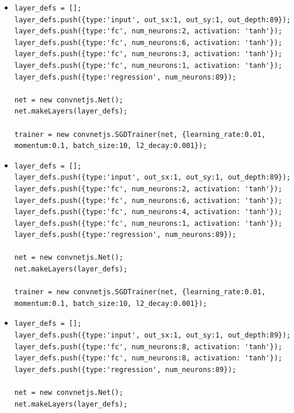 \begin{itemize}
\item \begin{verbatim}
layer_defs = [];
layer_defs.push({type:'input', out_sx:1, out_sy:1, out_depth:89});
layer_defs.push({type:'fc', num_neurons:2, activation: 'tanh'});
layer_defs.push({type:'fc', num_neurons:6, activation: 'tanh'});
layer_defs.push({type:'fc', num_neurons:3, activation: 'tanh'});
layer_defs.push({type:'fc', num_neurons:1, activation: 'tanh'});
layer_defs.push({type:'regression', num_neurons:89});

net = new convnetjs.Net();
net.makeLayers(layer_defs);

trainer = new convnetjs.SGDTrainer(net, {learning_rate:0.01, 
momentum:0.1, batch_size:10, l2_decay:0.001});
\end{verbatim}

\item \begin{verbatim}
layer_defs = [];
layer_defs.push({type:'input', out_sx:1, out_sy:1, out_depth:89});
layer_defs.push({type:'fc', num_neurons:2, activation: 'tanh'});
layer_defs.push({type:'fc', num_neurons:6, activation: 'tanh'});
layer_defs.push({type:'fc', num_neurons:4, activation: 'tanh'});
layer_defs.push({type:'fc', num_neurons:1, activation: 'tanh'});
layer_defs.push({type:'regression', num_neurons:89});

net = new convnetjs.Net();
net.makeLayers(layer_defs);

trainer = new convnetjs.SGDTrainer(net, {learning_rate:0.01, 
momentum:0.1, batch_size:10, l2_decay:0.001});
\end{verbatim}


\item \begin{verbatim}
layer_defs = [];
layer_defs.push({type:'input', out_sx:1, out_sy:1, out_depth:89});
layer_defs.push({type:'fc', num_neurons:8, activation: 'tanh'});
layer_defs.push({type:'fc', num_neurons:8, activation: 'tanh'});
layer_defs.push({type:'regression', num_neurons:89});

net = new convnetjs.Net();
net.makeLayers(layer_defs);


\end{verbatim}
\end{itemize}
